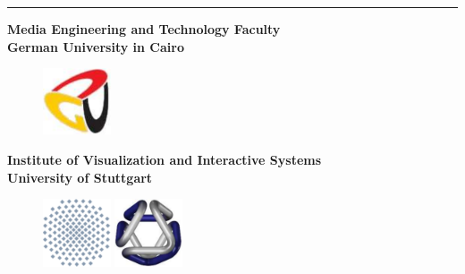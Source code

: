 \thispagestyle{empty}
\begin{center}
	\hrule
	\vspace{1cm}
	{\Large \bf Media Engineering and Technology Faculty}\\ %
	\vspace{0.3cm}
	{\Large \bf German University in Cairo}\\ %
	\begin{figure}[htb]
		\centering
		\includegraphics[width=2cm]{logos/logo-university-guc.pdf}
	\end{figure}
	
	\vspace{0.4cm}
	
	{\Large \bf Institute of Visualization and Interactive Systems}\\ %
	\vspace{0.3cm}
	{\Large \bf University of Stuttgart}\\ %

	\begin{figure}[htb]
		\centering
		\includegraphics[width=2cm]{logos/logo-university-stuttgart.pdf}
		\includegraphics[width=2cm]{logos/logo-university-vis.pdf}
	\end{figure}
	
	\vspace{2cm}
	
	{\Large \bf \titleOfThesisOne}\\
	\vspace{1cm}
	
	{\large \bf \typeOfThesis}\\
	\vspace{4cm}
	

\end{center}
